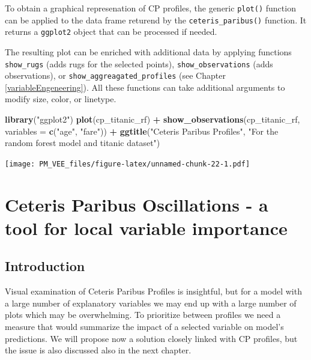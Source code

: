 \documentclass[12pt,]{krantz}
\newenvironment{Shaded}{\begin{snugshade}}{\end{snugshade}}
\newcommand{\DataTypeTok}[1]{\textcolor[rgb]{0.13,0.29,0.53}{#1}}
\newcommand{\KeywordTok}[1]{\textcolor[rgb]{0.13,0.29,0.53}{\textbf{#1}}}
\newcommand{\NormalTok}[1]{#1}
\newcommand{\OperatorTok}[1]{\textcolor[rgb]{0.81,0.36,0.00}{\textbf{#1}}}
\newcommand{\StringTok}[1]{\textcolor[rgb]{0.31,0.60,0.02}{#1}}
\theoremstyle{definition}
\theoremstyle{definition}
\theoremstyle{definition}
\theoremstyle{remark}
\begin{document}
To obtain a graphical represenation of CP profiles, the generic
\texttt{plot()} function can be applied to the data frame returend by
the \texttt{ceteris\_paribus()} function. It returns a \texttt{ggplot2}
object that can be processed if needed.

The resulting plot can be enriched with additional data by applying
functions \texttt{show\_rugs} (adds rugs for the selected points),
\texttt{show\_observations} (adds observations), or
\texttt{show\_aggreagated\_profiles} (see Chapter
\ref{variableEngeneering}). All these functions can take additional
arguments to modify size, color, or linetype.

\begin{Shaded}
\begin{Highlighting}[]
\KeywordTok{library}\NormalTok{(}\StringTok{"ggplot2"}\NormalTok{)}
\KeywordTok{plot}\NormalTok{(cp_titanic_rf) }\OperatorTok{+}
\StringTok{  }\KeywordTok{show_observations}\NormalTok{(cp_titanic_rf, }\DataTypeTok{variables =} \KeywordTok{c}\NormalTok{(}\StringTok{"age"}\NormalTok{, }\StringTok{"fare"}\NormalTok{)) }\OperatorTok{+}
\StringTok{  }\KeywordTok{ggtitle}\NormalTok{(}\StringTok{"Ceteris Paribus Profiles"}\NormalTok{, }\StringTok{"For the random forest model and titanic dataset"}\NormalTok{)}
\end{Highlighting}
\end{Shaded}

\texttt{[image: PM\_VEE\_files/figure-latex/unnamed-chunk-22-1.pdf]}

\hypertarget{ceterisParibusOscillations}{%
\section{Ceteris Paribus Oscillations - a tool for local variable
importance}\label{ceterisParibusOscillations}}

\hypertarget{introduction-2}{%
\subsection{Introduction}\label{introduction-2}}

Visual examination of Ceteris Paribus Profiles is insightful, but for a
model with a large number of explanatory variables we may end up with a
large number of plots which may be overwhelming. To prioritize between
profiles we need a measure that would summarize the impact of a selected
variable on model's predictions. We will propose now a solution closely
linked with CP profiles, but the issue is also discussed also in the
next chapter.
\end{document}
